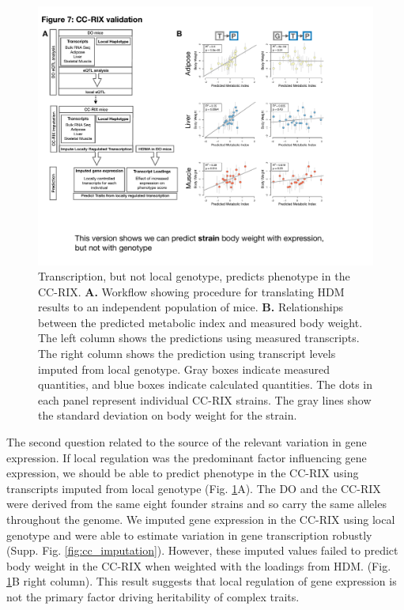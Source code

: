 \documentclass[
]{article}
\begin{document}
\begin{figure}[ht!]
\includegraphics[width=\textwidth]{Figures/Fig7_CC_Prediction.pdf} 
\caption{Transcription, but not local genotype, predicts 
phenotype in the CC-RIX. \textbf{A.} Workflow showing procedure 
for translating HDM results to an independent population of mice. 
\textbf{B.} Relationships between the predicted metabolic index 
and measured body weight. The left column shows the predictions 
using measured transcripts. The right column shows the prediction 
using transcript levels imputed from local genotype. Gray boxes 
indicate measured quantities, and blue boxes indicate calculated 
quantities. The dots in each panel represent individual CC-RIX strains. 
The gray lines show the standard deviation on body weight for the strain.
}
\label{fig:cc_prediction}
\end{figure}

The second question related to the source of the relevant variation in
gene expression. If local regulation was the predominant factor
influencing gene expression, we should be able to predict phenotype in
the CC-RIX using transcripts imputed from local genotype (Fig.
\ref{fig:cc_prediction}A). The DO and the CC-RIX were derived from the
same eight founder strains and so carry the same alleles throughout the
genome. We imputed gene expression in the CC-RIX using local genotype
and were able to estimate variation in gene transcription robustly
(Supp. Fig. \ref{fig:cc_imputation}). However, these imputed values
failed to predict body weight in the CC-RIX when weighted with the
loadings from HDM. (Fig. \ref{fig:cc_prediction}B right column). This
result suggests that local regulation of gene expression is not the
primary factor driving heritability of complex traits.
\end{document}
